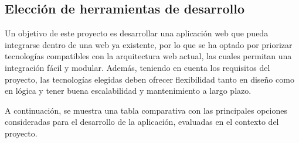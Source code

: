 \subsection{Elección de herramientas de desarrollo}
Un objetivo de este proyecto es desarrollar una aplicación web que pueda integrarse dentro de una web ya existente, por lo que se ha optado por priorizar tecnologías compatibles con la arquitectura web actual, las cuales permitan una integración fácil y modular. 
Además, teniendo en cuenta los requisitos del proyecto, las tecnologías elegidas deben ofrecer flexibilidad tanto en diseño como en lógica y tener buena escalabilidad y mantenimiento a largo plazo.

A continuación, se muestra una tabla comparativa con las principales opciones consideradas para el desarrollo de la aplicación, evaluadas en el contexto del proyecto.

